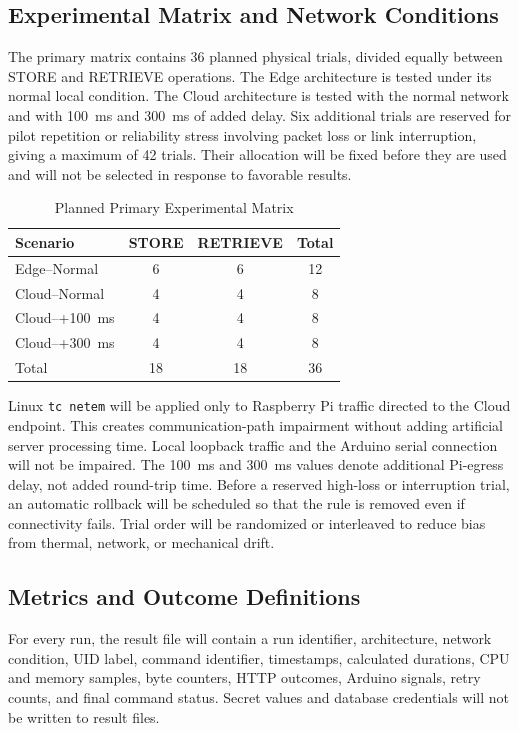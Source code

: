 \documentclass[conference]{IEEEtran}
\begin{document}
\subsection{Experimental Matrix and Network Conditions}
The primary matrix contains 36 planned physical trials, divided equally between STORE and RETRIEVE operations. The Edge architecture is tested under its normal local condition. The Cloud architecture is tested with the normal network and with 100~ms and 300~ms of added delay. Six additional trials are reserved for pilot repetition or reliability stress involving packet loss or link interruption, giving a maximum of 42 trials. Their allocation will be fixed before they are used and will not be selected in response to favorable results.

\begin{table}[t]
\caption{Planned Primary Experimental Matrix}
\label{tab:conditions}
\centering
\footnotesize
\begin{tabular}{lccc}
\toprule
Scenario & STORE & RETRIEVE & Total \\
\midrule
Edge--Normal & 6 & 6 & 12 \\
Cloud--Normal & 4 & 4 & 8 \\
Cloud--+100~ms & 4 & 4 & 8 \\
Cloud--+300~ms & 4 & 4 & 8 \\
\midrule
Total & 18 & 18 & 36 \\
\bottomrule
\end{tabular}
\end{table}

Linux \texttt{tc netem} will be applied only to Raspberry Pi traffic directed to the Cloud endpoint. This creates communication-path impairment without adding artificial server processing time. Local loopback traffic and the Arduino serial connection will not be impaired. The 100~ms and 300~ms values denote additional Pi-egress delay, not added round-trip time. Before a reserved high-loss or interruption trial, an automatic rollback will be scheduled so that the rule is removed even if connectivity fails. Trial order will be randomized or interleaved to reduce bias from thermal, network, or mechanical drift.

\subsection{Metrics and Outcome Definitions}
For every run, the result file will contain a run identifier, architecture, network condition, UID label, command identifier, timestamps, calculated durations, CPU and memory samples, byte counters, HTTP outcomes, Arduino signals, retry counts, and final command status. Secret values and database credentials will not be written to result files.
\end{document}

